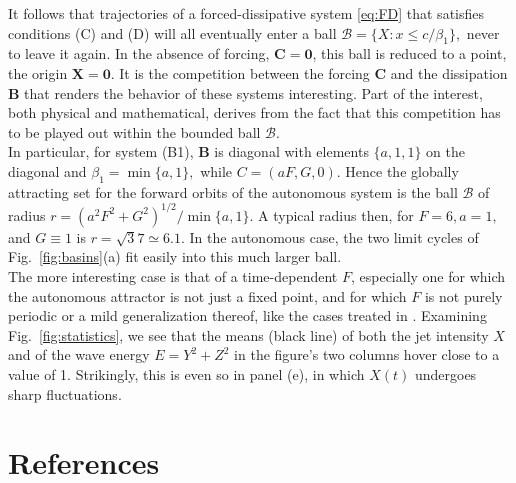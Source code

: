 \documentclass[%
 aip, cha,
 amsmath,amssymb,
 reprint,%
author-year,%
]{revtex4-1}
\newcommand{\X}{\mathbf X}
\newcommand{\0}{\mathbf 0}
\newcommand{\B}{\mathbf B}
\newcommand{\C}{\mathbf C}
\begin{document}
It follows that trajectories of a forced-dissipative system \eqref{eq:FD} that satisfies conditions (C) and (D) will all eventually enter a ball $\mathscr B = \{X: x \le c/\beta_1\},$ never to leave it again. In the absence of forcing, $\C = \0$, this ball is reduced to a point, the origin $\X = \0.$ It is the competition between the forcing $\C$ and the dissipation $\B$ that renders the behavior of these systems interesting. Part of the interest, both physical and mathe­matical, derives from the fact that this competition has to be played out within the bounded ball $\mathscr B.$ \\
In particular, for system (B1), %
$\B$ is diagonal with elements $\{a, 1, 1\}$ on the diagonal and $\beta_1 = \min\{a,1\},$ while $C = (aF, G, 0)$. Hence the globally attracting set for the forward orbits of the autonomous system is the ball $\mathscr B$ of radius $ r = (a^2 F^2 + G^2)^{1/2}/\min\{a,1\}.$ 
A typical radius then, for $F = 6, a = 1,$ and $G \equiv 1$ is $r = \sqrt 37 \simeq 6.1.$ In the autonomous case, the two limit cycles of Fig.~\ref{fig:basins}(a) fit easily into this much larger ball. \\
The more interesting case is that of a time-dependent $F$, especially one for which the autonomous attractor is not just a fixed point, and for which $F$ is not purely periodic or a mild generalization thereof, like the cases treated in \citet[Figs.~1--6]{Anguiano.Car.2014}. Examining Fig.~\ref{fig:statistics}, we see that the means (black line) of both the jet intensity $X$ and of the wave energy $E = Y^2 + Z^2$ in the figure's two columns hover close to a value of 1. Strikingly, this is even so in panel (e), in which $X(t)$ undergoes sharp fluctuations.





\section*{References}
\nocite{*}
 
\end{document}
